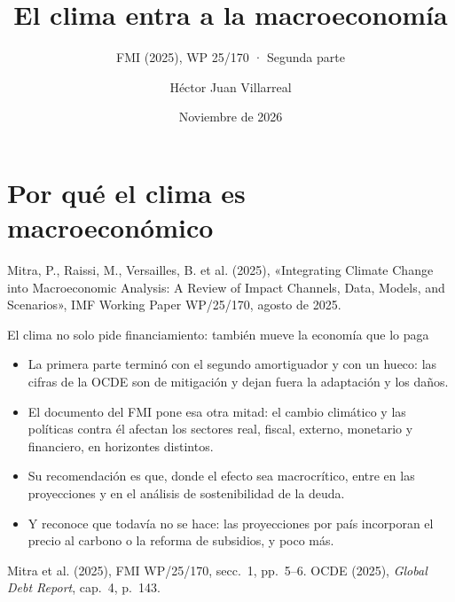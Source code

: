 \documentclass[aspectratio=169,11pt]{beamer}
\title{El clima entra a la macroeconomía}
\subtitle{FMI (2025), WP 25/170 · Segunda parte}
\author{Héctor Juan Villarreal}
\institute{Finanzas Públicas · Maestría en Economía Aplicada\\Escuela de Gobierno y Transformación Pública · Tec de Monterrey}
\date{Noviembre de 2026}
\newcommand{\fuente}[1]{\par\vfill{\small\color{cGris}#1\par}}
\newcommand{\FMI}{Mitra et al. (2025), FMI WP/25/170}
\newcommand{\GDR}{OCDE (2025), \emph{Global Debt Report}}
\begin{document}
\section{Por qué el clima es macroeconómico}

\begin{frame}[plain]
  \titlepage
  \vspace{-4mm}
  {\small\color{cGris}\centering Mitra, P., Raissi, M., Versailles, B. et al. (2025), «Integrating Climate Change into Macroeconomic Analysis: A Review of Impact Channels, Data, Models, and Scenarios», IMF Working Paper WP/25/170, agosto de 2025.\par}
\end{frame}

\begin{frame}{El clima no solo pide financiamiento: también mueve la economía que lo paga}
  \begin{itemize}
    \item<1-> La primera parte terminó con el segundo amortiguador y con un hueco: las cifras de la OCDE son de mitigación y dejan fuera la adaptación y los daños.
    \item<2-> El documento del FMI pone esa otra mitad: el cambio climático y las políticas contra él afectan los sectores real, fiscal, externo, monetario y financiero, en horizontes distintos.
    \item<3-> Su recomendación es que, donde el efecto sea macrocrítico, entre en las proyecciones y en el análisis de sostenibilidad de la deuda.
    \item<4-> Y reconoce que todavía no se hace: las proyecciones por país incorporan el precio al carbono o la reforma de subsidios, y poco más.
  \end{itemize}
  \fuente{\FMI, secc.~1, pp.~5--6. \GDR, cap.~4, p.~143.}
\end{frame}
\end{document}
